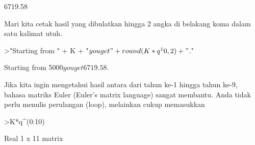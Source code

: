 \documentclass{article}
\newenvironment{eulernotebook}{\par}{\par}
\newenvironment{eulercomment}{\par\medskip}{\par\medskip}
\begin{document}
\begin{eulernotebook}
\begin{eulercomment}
\begin{eulercomment}
\begin{eulercomment}
\begin{eulercomment}
\begin{eulercomment}
\begin{eulercomment}
\begin{eulercomment}
\begin{eulercomment}
\begin{euleroutput}
      6719.58 
\end{euleroutput}
\begin{eulercomment}
Mari kita cetak hasil yang dibulatkan hingga 2 angka di belakang koma
dalam satu kalimat utuh.
\end{eulercomment}
\begin{eulerprompt}
>"Starting from " + K + "$ you get " + round(K*q^10,2) + "$."
\end{eulerprompt}
\begin{euleroutput}
  Starting from 5000$ you get 6719.58$.
\end{euleroutput}
\begin{eulercomment}
Jika kita ingin mengetahui hasil antara dari tahun ke-1 hingga tahun
ke-9, bahasa matriks Euler (Euler's matrix language) sangat membantu.
Anda tidak perlu menulis perulangan (loop), melainkan cukup memasukkan
\end{eulercomment}
\begin{eulerprompt}
>K*q^(0:10)
\end{eulerprompt}
\begin{euleroutput}
  Real 1 x 11 matrix
  

\end{euleroutput}
\end{eulercomment}
\end{eulercomment}
\end{eulercomment}
\end{eulercomment}
\end{eulercomment}
\end{eulercomment}
\end{eulercomment}
\end{eulercomment}
\end{eulernotebook}
\end{document}
